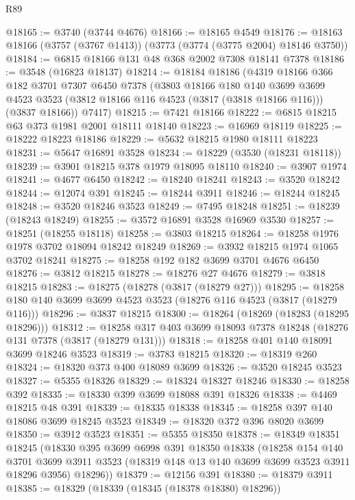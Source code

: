 \begin{lexlean}{R89}
\begin{coremodule}
@18165 := @3740 (@3744 @4676)
@18166 := @18165 @4549
@18176 := @18163 @18166 (@3757 (@3767 @1413)) (@3773 (@3774 (@3775 @2004) @18146 @3750))
@18184 := @6815 @18166 @131 @48 @368 @2002 @7308 @18141 @7378
@18186 := @3548 (@16823 @18137)
@18214 := @18184
    @18186
    (@4319
      @18166
      @366
      @182
      @3701
      @7307
      @6450
      @7378
      (@3803
        @18166
        @180
        @140
        @3699
        @3699
        @4523
        @3523
        (@3812 @18166 @116 @4523 (@3817 (@3818 @18166 @116)))
        (@3837 @18166))
      @7417)
@18215 := @7421 @18166
@18222 := @6815 @18215 @63 @373 @1981 @2001 @18111 @18140
@18223 := @16969 @18119
@18225 := @18222 @18223 @18186
@18229 := @5632 @18215 @1980 @18111 @18223
@18231 := @5647 @16891 @3528
@18234 := @18229 (@3530 (@18231 @18118))
@18239 := @3901 @18215 @378 @1979 @18095 @18110
@18240 := @3907 @1974
@18241 := @4677 @6450
@18242 := @18240 @18241
@18243 := @3520 @18242
@18244 := @12074 @391
@18245 := @18244 @3911
@18246 := @18244 @18245
@18248 := @3520 @18246 @3523
@18249 := @7495 @18248
@18251 := @18239 (@18243 @18249)
@18255 := @3572 @16891 @3528 @16969 @3530
@18257 := @18251 (@18255 @18118)
@18258 := @3803 @18215
@18264 := @18258 @1976 @1978 @3702 @18094 @18242 @18249
@18269 := @3932 @18215 @1974 @1065 @3702 @18241
@18275 := @18258 @192 @182 @3699 @3701 @4676 @6450
@18276 := @3812 @18215
@18278 := @18276 @27 @4676
@18279 := @3818 @18215
@18283 := @18275 (@18278 (@3817 (@18279 @27)))
@18295 := @18258 @180 @140 @3699 @3699 @4523 @3523 (@18276 @116 @4523 (@3817 (@18279 @116)))
@18296 := @3837 @18215
@18300 := @18264 (@18269 (@18283 (@18295 @18296)))
@18312 := @18258 @317 @403 @3699 @18093 @7378 @18248 (@18276 @131 @7378 (@3817 (@18279 @131)))
@18318 := @18258 @401 @140 @18091 @3699 @18246 @3523
@18319 := @3783 @18215
@18320 := @18319 @260
@18324 := @18320 @373 @400 @18089 @3699
@18326 := @3520 @18245 @3523
@18327 := @5355 @18326
@18329 := @18324 @18327 @18246
@18330 := @18258 @392
@18335 := @18330 @399 @3699 @18088 @391 @18326
@18338 := @4469 @18215 @48 @391
@18339 := @18335 @18338
@18345 := @18258 @397 @140 @18086 @3699 @18245 @3523
@18349 := @18320 @372 @396 @8020 @3699
@18350 := @3912 @3523
@18351 := @5355 @18350
@18378 := @18349
    @18351
    @18245
    (@18330
      @395
      @3699
      @6998
      @391
      @18350
      @18338
      (@18258
        @154
        @140
        @3701
        @3699
        @3911
        @3523
        (@18319 @148 @13 @140 @3699 @3699 @3523 @3911 @18296 @3956)
        @18296))
@18379 := @12156 @391
@18380 := @18379 @3911
@18385 := @18329 (@18339 (@18345 (@18378 @18380) @18296))

\end{coremodule}
\end{lexlean}
